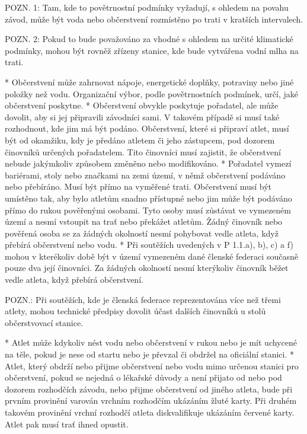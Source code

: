   POZN. 1: Tam, kde to povětrnostní podmínky vyžadují, s ohledem na povahu závod, může být voda nebo občerstvení rozmístěno po trati v kratších intervalech.

  POZN. 2: Pokud to bude považováno za vhodné s ohledem na určité klimatické podmínky, mohou být rovněž zřízeny stanice, kde bude vytvářena vodní mlha na trati.

  * Občerstvení může zahrnovat nápoje, energetické doplňky, potraviny nebo jiné položky než vodu. Organizační výbor, podle povětrnostních podmínek, určí, jaké občerstvení poskytne.
  * Občerstvení obvykle poskytuje pořadatel, ale může dovolit, aby si jej připravili závodníci sami. V takovém případě si musí také rozhodnout, kde jim má být podáno. Občerstvení, které si připraví atlet, musí být od okamžiku, kdy je předáno atletem či jeho zástupcem, pod dozorem činovníků určených pořadatelem. Tito činovníci musí zajistit, že občerstvení nebude jakýmkoliv způsobem změněno nebo modifikováno.
  * Pořadatel vymezí bariérami, stoly nebo značkami na zemi území, v němž občerstvení podáváno nebo přebíráno. Musí být přímo na vyměřené trati. Občerstvení musí být umístěno tak, aby bylo atletům snadno přístupné nebo jim může být podáváno přímo do rukou pověřenými osobami. Tyto osoby musí zůstávat ve vymezeném území a nesmí vstoupit na trať nebo překážet atletům. Žádný činovník nebo pověřená osoba se za žádných okolností nesmí pohybovat vedle atleta, když přebírá občerstvení nebo vodu.
  * Při soutěžích uvedených v P 1.1.a), b), c) a f) mohou v kterékoliv době být v území vymezeném dané členské federaci současně pouze dva její činovníci. Za žádných okolností nesmí kterýkoliv činovník běžet vedle atleta, když přebírá občerstvení.

  POZN.: Při soutěžích, kde je členská federace reprezentována více než třemi atlety, mohou technické předpisy dovolit účast dalších činovníků u stolů občerstvovací stanice.

  * Atlet může kdykoliv nést vodu nebo občerstvení v rukou nebo je mít uchycené na těle, pokud je nese od startu nebo je převzal či obdržel na oficiální stanici.
  * Atlet, který obdrží nebo přijme občerstvení nebo vodu mimo určenou stanici pro občerstvení, pokud se nejedná o lékařské důvody a není přijato od nebo pod dozorem rozhodčích závodu, nebo přijme občerstvení od jiného atleta, bude při prvním provinění varován vrchním rozhodčím ukázáním žluté karty. Při druhém takovém provinění vrchní rozhodčí atleta diskvalifikuje ukázáním červené karty. Atlet pak musí trať ihned opustit.

